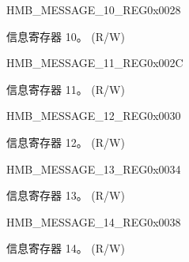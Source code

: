 \begin{register}{H}{MB\_MESSAGE\_10\_REG}{0x0028}\label{regdesc:MBMESSAGE10REG}
%
\regnewline%
\begin{regdesc}\begin{reglist}
\label{fielddesc:MBMESSAGE10}\item [MB\_MESSAGE\_10] 信息寄存器 10。 (R/W)
\end{reglist}\end{regdesc}
\end{register}


\begin{register}{H}{MB\_MESSAGE\_11\_REG}{0x002C}\label{regdesc:MBMESSAGE11REG}
%
\regnewline%
\begin{regdesc}\begin{reglist}
\label{fielddesc:MBMESSAGE11}\item [MB\_MESSAGE\_11] 信息寄存器 11。 (R/W)
\end{reglist}\end{regdesc}
\end{register}


\begin{register}{H}{MB\_MESSAGE\_12\_REG}{0x0030}\label{regdesc:MBMESSAGE12REG}
%
\regnewline%
\begin{regdesc}\begin{reglist}
\label{fielddesc:MBMESSAGE12}\item [MB\_MESSAGE\_12] 信息寄存器 12。 (R/W)
\end{reglist}\end{regdesc}
\end{register}


\begin{register}{H}{MB\_MESSAGE\_13\_REG}{0x0034}\label{regdesc:MBMESSAGE13REG}
%
\regnewline%
\begin{regdesc}\begin{reglist}
\label{fielddesc:MBMESSAGE13}\item [MB\_MESSAGE\_13] 信息寄存器 13。 (R/W)
\end{reglist}\end{regdesc}
\end{register}


\begin{register}{H}{MB\_MESSAGE\_14\_REG}{0x0038}\label{regdesc:MBMESSAGE14REG}
%
\regnewline%
\begin{regdesc}\begin{reglist}
\label{fielddesc:MBMESSAGE14}\item [MB\_MESSAGE\_14] 信息寄存器 14。 (R/W)
\end{reglist}\end{regdesc}
\end{register}



